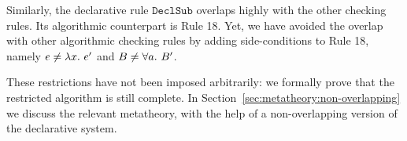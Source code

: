 Similarly, the declarative rule $\mathtt{DeclSub}$ overlaps highly with the
other checking rules. Its algorithmic counterpart is Rule 18. Yet, we have
avoided the overlap with other algorithmic checking rules by adding
side-conditions to Rule 18, namely $e\neq\lam e'$ and $B\neq\all B'$.

These restrictions have not been imposed arbitrarily:
we formally prove that the restricted algorithm is still complete.
In Section~\ref{sec:metatheory:non-overlapping} we discuss the relevant metatheory,
with the help of a non-overlapping version of the declarative system.

